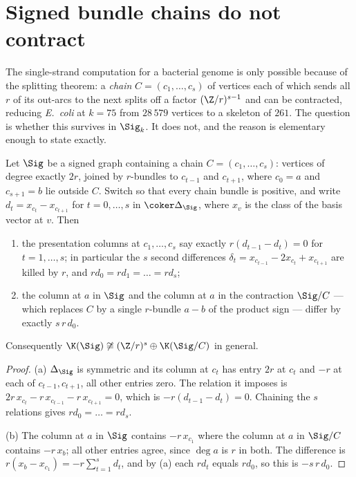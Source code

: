 \section{Signed bundle chains do not contract}\label{Bio7:sec:series}

The single-strand computation for a bacterial genome is only possible because of the
splitting theorem: a \emph{chain} $C=(c_1,\dots,c_s)$ of vertices each of which sends all
$r$ of its out-arcs to the next splits off a factor $(\Z/r)^{s-1}$ and can be contracted,
reducing \emph{E.\ coli} at $k=75$ from $28\,579$ vertices to a skeleton of $261$. The
question is whether this survives in $\Sig_k$. It does not, and the reason is elementary
enough to state exactly.

\begin{theorem}\label{Bio7:thm:series}
Let $\Sig$ be a signed graph containing a chain $C=(c_1,\dots,c_s)$: vertices of degree
exactly $2r$, joined by $r$-bundles to $c_{t-1}$ and $c_{t+1}$, where $c_0=a$ and
$c_{s+1}=b$ lie outside $C$. Switch so that every chain bundle is positive, and write
$d_t=x_{c_t}-x_{c_{t+1}}$ for $t=0,\dots,s$ in $\coker\Delta_\Sig$, where $x_v$ is the class
of the basis vector at $v$. Then
\begin{enumerate}
\item[\rm(a)] the presentation columns at $c_1,\dots,c_s$ say exactly
      $r(d_{t-1}-d_t)=0$ for $t=1,\dots,s$; in particular the $s$ second differences
      $\delta_t=x_{c_{t-1}}-2x_{c_t}+x_{c_{t+1}}$ are killed by $r$, and
      $r d_0=r d_1=\dots=r d_s$;
\item[\rm(b)] the column at $a$ in $\Sig$ and the column at $a$ in the contraction $\Sig/C$
      --- which replaces $C$ by a single $r$-bundle $a\!-\!b$ of the product sign --- differ
      by exactly $s\,r\,d_0$.
\end{enumerate}
Consequently $\K(\Sig)\not\cong(\Z/r)^s\oplus\K(\Sig/C)$ in general.
\end{theorem}

\begin{proof}
(a) $\Delta_\Sig$ is symmetric and its column at $c_t$ has entry $2r$ at $c_t$ and $-r$ at
each of $c_{t-1},c_{t+1}$, all other entries zero. The relation it imposes is
$2r\,x_{c_t}-r\,x_{c_{t-1}}-r\,x_{c_{t+1}}=0$, which is $-r(d_{t-1}-d_t)=0$. Chaining the
$s$ relations gives $r d_0=\dots=r d_s$.

(b) The column at $a$ in $\Sig$ contains $-r\,x_{c_1}$ where the column at $a$ in $\Sig/C$
contains $-r\,x_b$; all other entries agree, since $\deg a$ is $r$ in both. The difference is
$r(x_b-x_{c_1})=-r\sum_{t=1}^s d_t$, and by (a) each $r d_t$ equals $r d_0$, so this is
$-s\,r\,d_0$.
\end{proof}

